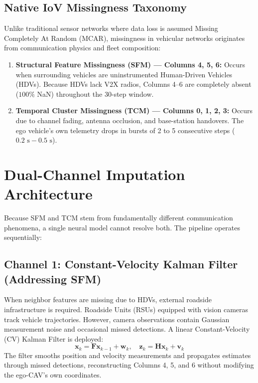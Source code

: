 \documentclass[11pt,a4paper]{article}
\begin{document}
\subsection{Native IoV Missingness Taxonomy}
Unlike traditional sensor networks where data loss is assumed Missing Completely At Random (MCAR), missingness in vehicular networks originates from communication physics and fleet composition:
\begin{enumerate}[leftmargin=1.5em, itemsep=2pt]
    \item \textbf{Structural Feature Missingness (SFM) --- Columns 4, 5, 6:} Occurs when surrounding vehicles are uninstrumented Human-Driven Vehicles (HDVs). Because HDVs lack V2X radios, Columns 4--6 are completely absent ($100\%$ NaN) throughout the 30-step window.
    \item \textbf{Temporal Cluster Missingness (TCM) --- Columns 0, 1, 2, 3:} Occurs due to channel fading, antenna occlusion, and base-station handovers. The ego vehicle's own telemetry drops in bursts of 2 to 5 consecutive steps ($0.2\text{ s} - 0.5\text{ s}$).
\end{enumerate}

\vspace{0.8em}

\section{Dual-Channel Imputation Architecture}
Because SFM and TCM stem from fundamentally different communication phenomena, a single neural model cannot resolve both. The pipeline operates sequentially:

\subsection{Channel 1: Constant-Velocity Kalman Filter (Addressing SFM)}
When neighbor features are missing due to HDVs, external roadside infrastructure is required. Roadside Units (RSUs) equipped with vision cameras track vehicle trajectories. However, camera observations contain Gaussian measurement noise and occasional missed detections. A linear Constant-Velocity (CV) Kalman Filter is deployed:
\begin{equation}
    \mathbf{x}_{k} = \mathbf{F} \mathbf{x}_{k-1} + \mathbf{w}_k, \quad \mathbf{z}_k = \mathbf{H} \mathbf{x}_k + \mathbf{v}_k
\end{equation}
The filter smooths position and velocity measurements and propagates estimates through missed detections, reconstructing Columns 4, 5, and 6 without modifying the ego-CAV's own coordinates.
\end{document}
